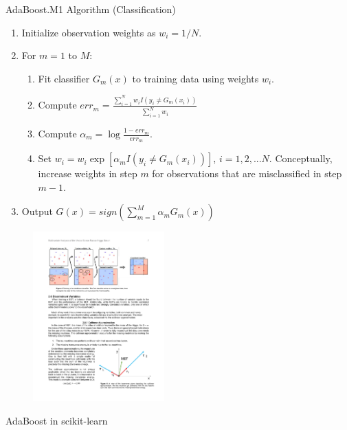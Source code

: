 \documentclass[aspectratio=169]{beamer}
\begin{document}
\begin{frame}{AdaBoost.M1 Algorithm (Classification)}
    \label{frame:adaboost}
    \begin{enumerate}
        \item Initialize observation weights as $w_i = 1/N$.
        \item For $m=1$ to $M$:
        \begin{enumerate}
            \item Fit classifier $G_m(x)$ to training data using weights $w_i$.
            \item Compute $err_m = \frac{\sum_{i=1}^{N} w_i I(y_i \neq G_m(x_i))}{\sum_{i=1}^{N} w_i}$
            \item Compute $\alpha_m = \log{\frac{1-err_m}{err_m}}$.
            \item Set $w_i = w_i\exp[\alpha_mI(y_i \neq G_m(x_i))]$, $i = 1, 2, ...N$. Conceptually, increase weights in step $m$ for observations that are misclassified in step $m-1$.
        \end{enumerate}
        \item Output $G(x) = sign\left( \sum_{m=1}^M \alpha_mG_m(x)\right)$
    \end{enumerate}
    \begin{figure}
        \centering
        \includegraphics[width=0.45\textwidth]{figures/adaboostalgo.pdf}
    \end{figure}
\end{frame}


\begin{frame}[fragile]{AdaBoost in scikit-learn}
\inputminted{python}{example_sklearn_adaboost.py}
\end{frame}
\end{document}
